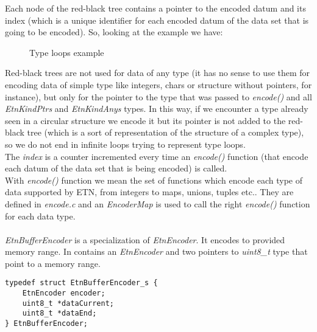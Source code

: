 Each node of the red-black tree contains a pointer to the encoded datum and its index (which is a unique identifier for each encoded datum of the data set that is going to be encoded). So, looking at the example we have:
\begin{figure}[H]
\centering
{}

\caption{Type loops example}
\end{figure}
Red-black trees are not used for data of any type (it has no sense to use them for encoding data of simple type like integers, chars or structure without pointers, for instance), but only for the pointer to the type that was passed to \emph{encode()} and all \emph{EtnKindPtrs} and \emph{EtnKindAnys} types. In this way, if we encounter a type already seen in a circular structure we encode it but its pointer is not added to the red-black tree (which is a sort of representation of the structure of a complex type), so we do not end in infinite loops trying to represent type loops. \\
The \emph{index} is a counter incremented every time an \emph{encode()} function (that encode each datum of the data set that is being encoded) is called. \\
With \emph{encode()} function we mean the set of functions which encode each type of data supported by ETN, from integers to maps, unions, tuples etc.. They are defined in \emph{encode.c} and an \emph{EncoderMap} is used to call the right \emph{encode()} function for each data type.\\\\
\emph{EtnBufferEncoder} is a specialization of \emph{EtnEncoder}. It encodes to provided memory range. In contains an \emph{EtnEncoder} and two pointers to \emph{uint8\_t} type that point to a memory range.
\begin{lstlisting}
typedef struct EtnBufferEncoder_s {
	EtnEncoder encoder;
	uint8_t *dataCurrent;
	uint8_t *dataEnd;
} EtnBufferEncoder;
\end{lstlisting}
